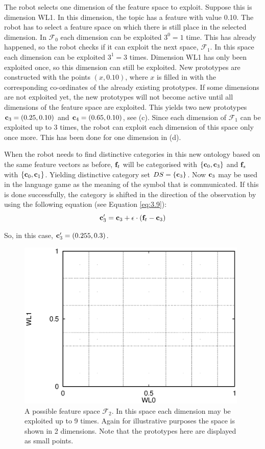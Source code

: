 The robot selects one dimension of the feature space to exploit. Suppose this is dimension WL1. In this dimension, the topic has a feature with value 0.10. The robot has to select a feature space on which there is still place in the selected dimension. In ${\mathcal F}_0$ each dimension can be exploited $3^0=1$ time. This has already happened, so the robot checks if it can exploit the next space, ${\mathcal F}_1$. In this space each dimension can be exploited $3^1=3$ times. Dimension WL1 has only been exploited once, so this dimension can still be exploited. New prototypes are constructed with the points $(x,0.10)$, where $x$ is filled in with the corresponding co-ordinates of the already existing prototypes. If some dimensions are not exploited yet, the new prototypes will not become active until all dimensions of the feature space are exploited. This yields two new prototypes ${\bf c}_3=(0.25,0.10)$ and ${\bf c}_4=(0.65,0.10)$, see  (c). Since each dimension of ${\mathcal F}_1$ can be exploited up to 3 times, the robot can exploit each dimension of this space only once more. This has been done for one dimension in  (d).

When the robot needs to find distinctive categories in this new ontology based on the same feature vectors as before, ${\bf f}_t$ will be categorised with $\{{\bf c}_0,{\bf c}_3\}$ and ${\bf f}_s$ with $\{{\bf c}_0,{\bf c}_1\}$. Yielding distinctive category set $DS=\{{\bf c}_3\}$. Now ${\bf c}_3$ may be used in the language game as the meaning of the symbol that is communicated. If this is done successfully, the category is shifted in the direction of the observation by using the following equation (see Equation \ref{eq:3.9}):
\[
{\bf c}_3' = {\bf c}_3 + \epsilon \cdot ({\bf f}_t - {\bf c}_3)
\]

So, in this case, ${\bf c}_3'=(0.255,0.3)$.

\begin{figure}
\centerline{\includegraphics[width=11cm]{lang_games/proto3.eps}}
\caption{A possible feature space ${\mathcal F}_2$. In this space each dimension may be exploited up to 9 times. Again for illustrative purposes the space is shown in 2 dimensions. Note that the prototypes here are displayed as small points.}
\label{f:lg:proto2}
\end{figure}


